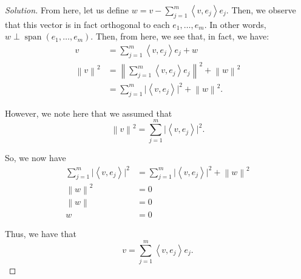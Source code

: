 \documentclass{article}
\newenvironment{solution}{\begin{proof}[Solution]}{\end{proof}}
\newcommand{\norm}[1]{\left\lVert{#1}\right\rVert}
\DeclareMathOperator*{\vspan}{\mathrm{span}}
\newcommand{\innerproduct}[2]{\left\langle{#1}, {#2}\right\rangle}
\begin{document}
\begin{solution}
		From here, let us define $w = v - \sum_{j=1}^{m} \innerproduct{v}{e_{j}}e_{j}$. Then, we observe that this vector is in fact orthogonal to each $e_{1}, \ldots, e_{m}$. In other words, $w \perp \vspan(e_{1}, \ldots, e_{m})$. Then, from here, we see that, in fact, we have:
		\begin{align*}
			v &= \sum_{j=1}^{m} \innerproduct{v}{e_{j}}e_{j} + w \\
			\norm{v}^{2} &= \norm{\sum_{j=1}^{m} \innerproduct{v}{e_{j}}e_{j}}^{2} + \norm{w}^{2} \tag{Pythagorean Theorem} \\
			&= \sum_{j=1}^{m} \lvert \innerproduct{v}{e_{j}} \rvert^{2} + \norm{w}^{2}.
		\end{align*}
	
		However, we note here that we assumed that
		\begin{equation*}
			\norm{v}^{2} = \sum_{j=1}^{m} \lvert \innerproduct{v}{e_{j}} \rvert^{2}.
		\end{equation*}
	
		So, we now have 
		\begin{align*}
			\sum_{j=1}^{m} \lvert \innerproduct{v}{e_{j}} \rvert^{2} &= \sum_{j=1}^{m} \lvert \innerproduct{v}{e_{j}} \rvert^{2} + \norm{w}^{2} \\
			\norm{w}^{2} &= 0 \\
			\norm{w} &= 0 \\
			w &= 0
		\end{align*}
	
		Thus, we have that
		\begin{equation*}
			v = \sum_{j=1}^{m} \innerproduct{v}{e_{j}}e_{j}.
		\end{equation*}
		\begin{comment}
			let us proceed with contraposition instead. Suppose that $v \not\in \vspan(e_{1}, \ldots, e_{m})$. Then, we observe that for all $a_{i} \in \mathbb{F}$, we have:
		\begin{align*}
			v &\neq a_{1}e_{1} + \ldots + a_{m}e_{m} \\
			\norm{v}^{2} &\neq \norm{a_{1}e_{1} + \ldots + a_{m}e_{m}}^{2} \\
			\norm{v}^{2} &\neq \lvert a_{1} \rvert^{2} + \ldots + \lvert a_{m} \rvert^{2} \\
			\norm{v}^{2} = \sum_{j=1}^{m} \lvert \innerproduct{v}{e_{j}} \rvert^{2}.
		\end{align*}
		\end{comment}
	
		
	
		\begin{comment}
			Now, we note that since $e_{1}, \ldots, e_{m}$ are an orthonormal list of vectors in $V$, we can in fact extend it to be an orthonormal basis for $V$. Let us denote this basis as $e_{1}, \ldots, e_{m}, e_{m+1}, \ldots, e_{n}$.
		

\end{comment}
\end{solution}
\end{document}
